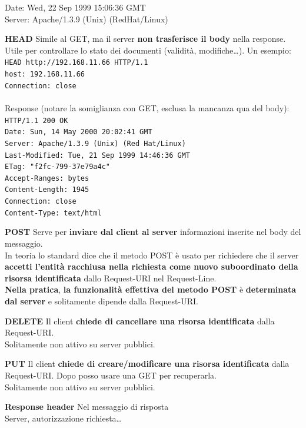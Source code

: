 \documentclass[10pt]{article}
\begin{document}
\begin{list}{}{}
\begin{list}{}{}
\begin{list}{}{(Alcuni) metodi request:}
{Date: Wed, 22 Sep 1999 15:06:36 GMT\\
Server: Apache/1.3.9 (Unix) (RedHat/Linux)}\\
\item \textbf{HEAD} Simile al GET, ma il server \textbf{non trasferisce il body} nella response. Utile per controllare lo stato dei documenti (validità, modifiche\ldots). Un esempio:\\
\texttt{HEAD http://192.168.11.66 HTTP/1.1\\
host: 192.168.11.66\\
Connection: close}\\\\
Response (notare la somiglianza con GET, esclusa la mancanza qua del body):\\
\texttt{HTTP/1.1 200 OK\\
Date: Sun, 14 May 2000 20:02:41 GMT\\
Server: Apache/1.3.9 (Unix) (Red Hat/Linux)\\
Last-Modified: Tue, 21 Sep 1999 14:46:36 GMT\\
ETag: "f2fc-799-37e79a4c"\\
Accept-Ranges: bytes\\
Content-Length: 1945\\
Connection: close\\
Content-Type: text/html}\\
\item \textbf{POST} Serve per \textbf{inviare dal client al server} informazioni inserite nel body del messaggio.\\In teoria lo standard dice che il metodo POST è usato per richiedere che il server \textbf{accetti l'entità racchiusa nella richiesta come nuovo suboordinato della risorsa identificata} dallo Request-URI nel Request-Line.\\\textbf{Nella pratica}, \textbf{la funzionalità effettiva del metodo POST} è \textbf{determinata dal server} e solitamente dipende dalla Request-URI.\\
\item \textbf{DELETE} Il client \textbf{chiede di cancellare una risorsa identificata} dalla Request-URI.\\Solitamente non attivo su server pubblici.\\
\item \textbf{PUT} Il client \textbf{chiede di creare/modificare una risorsa identificata} dalla Request-URI. Dopo posso usare una GET per recuperarla.\\Solitamente non attivo su server pubblici.
\end{list}
\item \textbf{Response header} Nel messaggio di risposta\\Server, autorizzazione richiesta\ldots
\end{list}

\end{list}
\end{document}
